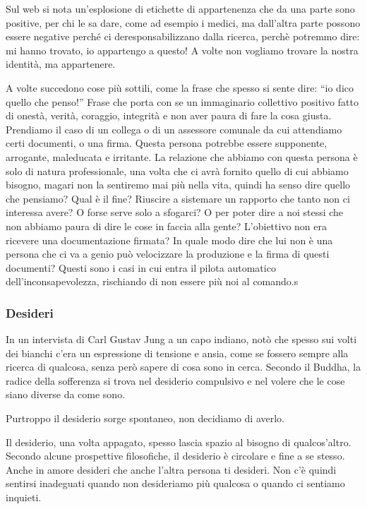 \documentclass[12pt]{book} %
\begin{document}
Sul web si nota un'esplosione di etichette di appartenenza che da una parte sono positive, per chi le sa dare, come ad esempio i medici, ma dall'altra parte possono essere negative perché ci deresponsabilizzano dalla ricerca, perchè potremmo dire: mi hanno trovato, io appartengo a questo!
A volte non vogliamo trovare la nostra identità, ma appartenere. 

A volte succedono cose più sottili, come la frase che spesso si sente dire: “io dico quello che penso!” Frase che porta
con se un immaginario collettivo positivo fatto di onestà, verità, coraggio, integrità e non aver paura di fare la cosa
giusta. Prendiamo il caso di un collega o di un assessore
comunale da cui attendiamo certi documenti, o una firma. Questa persona potrebbe essere supponente, arrogante,
maleducata e irritante. La relazione che abbiamo con questa persona è solo di natura professionale, una volta che ci
avrà fornito quello di cui abbiamo bisogno, magari non la sentiremo mai più nella vita, quindi ha senso dire quello che
pensiamo? Qual è il fine? Riuscire a sistemare un rapporto che tanto non ci interessa avere? O forse serve solo a
sfogarci? O per poter dire a noi stessi che non abbiamo paura di dire le cose in faccia alla gente? L'obiettivo non era ricevere una documentazione firmata? In quale modo dire che lui non è una
persona che ci va a genio può velocizzare la produzione e la firma di questi documenti? Questi sono i casi in cui entra
il pilota automatico dell'inconsapevolezza, rischiando di non essere più noi al comando.s

\subsubsection{Desideri}
In un intervista di Carl Gustav Jung a un capo indiano, notò che spesso sui volti dei bianchi c'era un espressione di tensione e ansia, come se fossero sempre alla ricerca di qualcosa, senza però sapere di cosa sono in cerca. Secondo il Buddha, la radice della sofferenza si trova nel desiderio compulsivo e nel volere che le cose siano diverse da come sono.

Purtroppo il desiderio sorge spontaneo, non decidiamo di averlo.

Il desiderio, una volta appagato, spesso lascia spazio al bisogno di qualcos'altro. Secondo alcune prospettive filosofiche, il desiderio è circolare e fine a se stesso. Anche in amore desideri che anche l'altra persona ti desideri. Non c'è quindi sentirsi inadeguati quando non desideriamo più
qualcosa o quando ci sentiamo inquieti.
\end{document}
